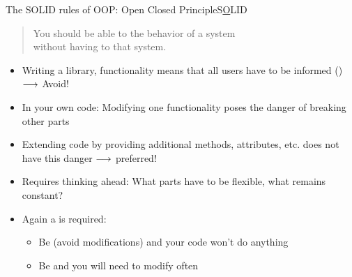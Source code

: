 \begin{frame}{The SOLID rules of OOP: Open Closed Principle}{S\underline  OLID}
	\begin{quote}
		You should be able to  the behavior of a system\\
		without having to  that system.
	\end{quote}

	\begin{itemize}
		\item Writing a library,  functionality means that all users have to be informed () $\longrightarrow$ Avoid!
		\item In your own code: Modifying one functionality  poses the danger of breaking other parts 
		\item Extending code by providing additional methods, attributes, etc. does not have this danger $\longrightarrow$ preferred!
		\item Requires thinking ahead: What parts have to be flexible, what remains constant?
		\item Again a  is required:
		\begin{itemize}
			\item Be  (avoid modifications) and your code won't do anything
			\item Be  and you will need to modify  often
		\end{itemize}
	\end{itemize}
\end{frame}

